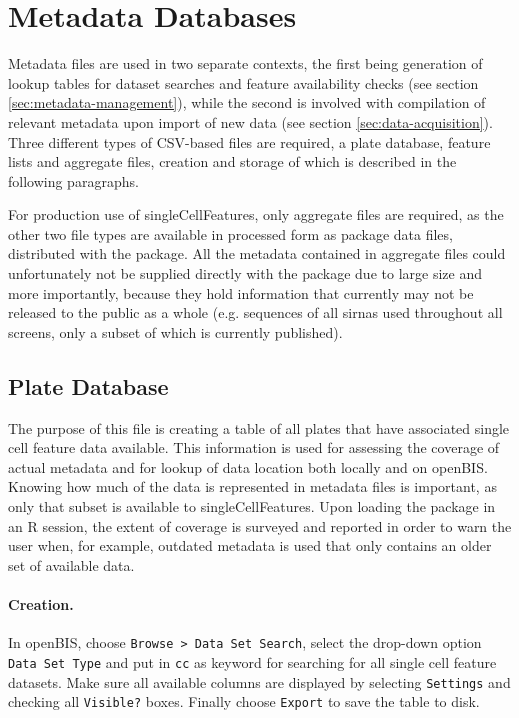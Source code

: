 \section{Metadata Databases}
\label{sec:update-metadata}
Metadata files are used in two separate contexts, the first being generation of lookup tables for dataset searches and feature availability checks (see section \ref{sec:metadata-management}), while the second is involved with compilation of relevant metadata upon import of new data (see section \ref{sec:data-acquisition}). Three different types of CSV-based files are required, a plate database, feature lists and aggregate files, creation and storage of which is described in the following paragraphs.

For production use of singleCellFeatures, only aggregate files are required, as the other two file types are available in processed form as package data files, distributed with the package. All the metadata contained in aggregate files could unfortunately not be supplied directly with the package due to large size and more importantly, because they hold information that currently may not be released to the public as a whole (e.g. sequences of all \glspl{sirna} used throughout all screens, only a subset of which is currently published).

\subsection{Plate Database}
The purpose of this file is creating a table of all plates that have associated single cell feature data available. This information is used for assessing the coverage of actual metadata and for lookup of data location both locally and on openBIS. Knowing how much of the data is represented in metadata files is important, as only that subset is available to singleCellFeatures. Upon loading the package in an R session, the extent of coverage is surveyed and reported in order to warn the user when, for example, outdated metadata is used that only contains an older set of available data.

\paragraph{Creation.}
In openBIS, choose \texttt{Browse > Data Set Search}, select the drop-down option \texttt{Data Set Type} and put in \texttt{cc} as keyword for searching for all single cell feature datasets. Make sure all available columns are displayed by selecting \texttt{Settings} and checking all \texttt{Visible?} boxes. Finally choose \texttt{Export} to save the table to disk.

